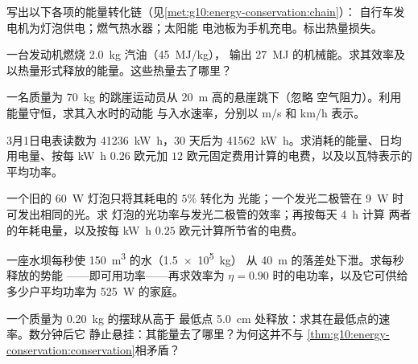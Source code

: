 \begin{exercise}[$\star$]\label{exo:g10:energy-conservation:5}
写出以下各项的能量转化链（见\cref{met:g10:energy-conservation:chain}）：
自行车发电机为灯泡供电；燃气热水器；太阳能
电池板为手机充电。标出热量损失。
\end{exercise}

\begin{exercise}[$\star\star$]\label{exo:g10:energy-conservation:6}
一台发动机燃烧 \qty{2.0}{kg} 汽油（\qty{45}{MJ/kg}），
输出 \qty{27}{MJ} 的机械能。求其效率及
以热量形式释放的能量。这些热量去了哪里？
\end{exercise}

\begin{exercise}[$\star\star$]\label{exo:g10:energy-conservation:7}
一名质量为 \qty{70}{kg} 的跳崖运动员从 \qty{20}{m} 高的悬崖跳下（忽略
空气阻力）。利用能量守恒，求其入水时的动能
与入水速率，分别以 \unit{m/s} 和 \unit{km/h} 表示。
\end{exercise}

\begin{exercise}[$\star\star$]\label{exo:g10:energy-conservation:8}
3月1日电表读数为 \qty{41236}{kW.h}，30
天后为 \qty{41562}{kW.h}。求消耗的能量、日均用电量、按每
\unit{kW.h} $0.26$ 欧元加 $12$ 欧元固定费用计算的电费，以及以瓦特表示的平均功率。
\end{exercise}

\begin{exercise}[$\star\star$]\label{exo:g10:energy-conservation:9}
一个旧的 \qty{60}{W} 灯泡只将其耗电的 $5\%$ 转化为
光能；一个发光二极管在 \qty{9}{W} 时可发出相同的光。求
灯泡的光功率与发光二极管的效率；再按每天 \qty{4}{h} 计算
两者的年耗电量，以及按每
\unit{kW.h} $0.25$ 欧元计算所节省的电费。
\end{exercise}

\begin{exercise}[$\star\star$]\label{exo:g10:energy-conservation:10}
一座水坝每秒使 \qty{150}{m^3} 的水（\qty{1.5e5}{kg}）
从 \qty{40}{m} 的落差处下泄。求每秒释放的势能
——即可用功率——再求效率为
$\eta = 0.90$ 时的电功率，以及它可供给多少户平均功率为 \qty{525}{W} 的家庭。
\end{exercise}

\begin{exercise}[$\star\star$]\label{exo:g10:energy-conservation:11}
一个质量为 \qty{0.20}{kg} 的摆球从高于
最低点 \qty{5.0}{cm} 处释放：求其在最低点的速率。数分钟后它
静止悬挂：其能量去了哪里？为何这并不与
\cref{thm:g10:energy-conservation:conservation}相矛盾？
\end{exercise}

